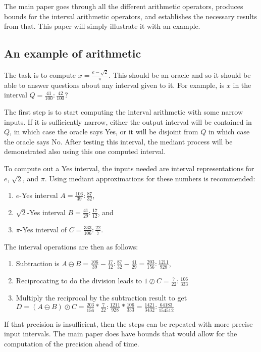 \documentclass[12pt]{article}
\theoremstyle{remark}
\begin{document}
The main paper goes through all the different arithmetic operators, produces bounds for the interval arithmetic operators, and establishes the necessary results from that. This paper will simply illustrate it with an example. 

\subsection{An example of arithmetic}

The task is to compute $x = \frac{e-\sqrt{2}}{\pi}$. This should be an oracle and so it should be able to answer questions about any interval given to it. For example, is $x$ in the interval $Q = \frac{41}{100}: \frac{42}{100}$? 

The first step is to start computing the interval arithmetic with some narrow inputs. If it is sufficiently narrow, either the output interval will be contained in $Q$, in which case the oracle says Yes, or it will be disjoint from $Q$ in which case the oracle says No. After testing this interval, the mediant process will be demonstrated also using this one computed interval. 

To compute out a Yes interval, the inputs needed are interval representations for $e$, $\sqrt{2}$, and $\pi$. Using mediant approximations for these numbers is recommended: 
\begin{enumerate}
\item $e$-Yes interval $A  = \frac{106}{39}: \frac{87}{32}$,
\item $\sqrt{2}$-Yes interval $B = \frac{41}{29}: \frac{17}{12}$, and
\item $\pi$-Yes interval of $C= \frac{333}{106}: \frac{22}{7}$.
\end{enumerate}
The interval operations are then as follows:
\begin{enumerate}
\item Subtraction is $A\ominus B = \frac{106}{39} - \frac{17}{12}: \frac{87}{32} - \frac{41}{29} = \frac{203}{156}: \frac{1211}{928}$,
\item Reciprocating to do the division leads to  $1\oslash C = \frac{7}{22}: \frac{106}{333}$
\item Multiply the reciprocal by the subtraction result to get $D = (A\ominus B)\oslash C = \frac{203}{156} *\frac{7}{22}: \frac{1211}{928} * \frac{106}{333} = \frac{1421}{3432}: \frac{64183}{154512}$
\end{enumerate}
If that precision is insufficient, then the steps can be repeated with more precise input intervals. The main paper does have bounds that would allow for the computation of the precision ahead of time. 
\end{document}
